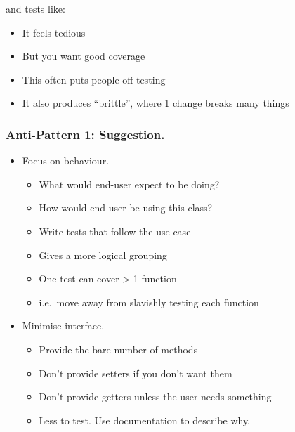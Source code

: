 and tests like:

\begin{Shaded}
\begin{Highlighting}[]
\NormalTok{, }\NormalTok{ ) \{}


\NormalTok{);}
\NormalTok{);}
\NormalTok{);}
\NormalTok{);}
\end{Highlighting}
\end{Shaded}

\begin{itemize}
\tightlist
\item
  It feels tedious
\item
  But you want good coverage
\item
  This often puts people off testing
\item
  It also produces ``brittle'', where 1 change breaks many things
\end{itemize}

\hypertarget{anti-pattern-1-suggestion.}{%
\subsubsection{Anti-Pattern 1:
Suggestion.}\label{anti-pattern-1-suggestion.}}

\begin{itemize}
\tightlist
\item
  Focus on behaviour.

  \begin{itemize}
  \tightlist
  \item
    What would end-user expect to be doing?
  \item
    How would end-user be using this class?
  \item
    Write tests that follow the use-case
  \item
    Gives a more logical grouping
  \item
    One test can cover \textgreater{} 1 function
  \item
    i.e.~move away from slavishly testing each function
  \end{itemize}
\item
  Minimise interface.

  \begin{itemize}
  \tightlist
  \item
    Provide the bare number of methods
  \item
    Don't provide setters if you don't want them
  \item
    Don't provide getters unless the user needs something
  \item
    Less to test. Use documentation to describe why.
  \end{itemize}
\end{itemize}

